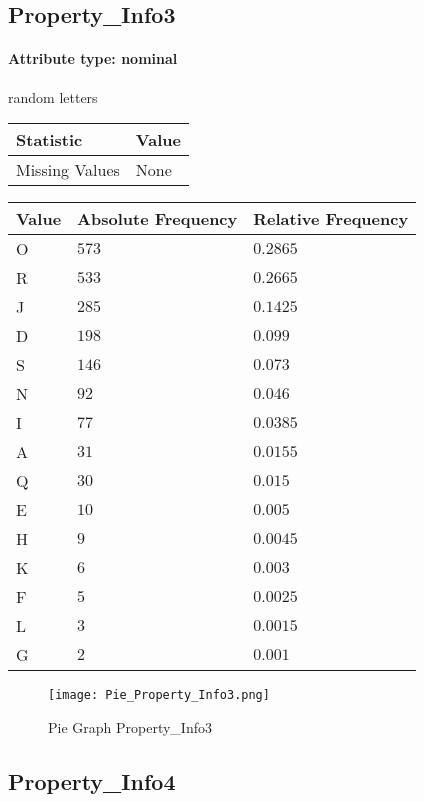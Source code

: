 \subsection{Property\_Info3}
\paragraph{Attribute type: nominal} random letters

\begin{table}[H]
	\renewcommand{\arraystretch}{1.25}
	\begin{tabular}{l|l}
		\textbf{Statistic} & \textbf{Value}\\\hline
		Missing Values& None\\\hline
	\end{tabular}
\end{table}
\begin{table}[H]
	\renewcommand{\arraystretch}{1.25}
	\begin{tabular}{l|l|l}
		\textbf{Value} & \textbf{Absolute Frequency} & \textbf{Relative Frequency}\\\hline
		O&$573$&$0.2865$\\\hline
		R&$533$&$0.2665$\\\hline
		J&$285$&$0.1425$\\\hline
		D&$198$&$0.099$\\\hline
		S&$146$&$0.073$\\\hline
		N&$92$&$0.046$\\\hline
		I&$77$&$0.0385$\\\hline
		A&$31$&$0.0155$\\\hline
		Q&$30$&$0.015$\\\hline
		E&$10$&$0.005$\\\hline
		H&$9$&$0.0045$\\\hline
		K&$6$&$0.003$\\\hline
		F&$5$&$0.0025$\\\hline
		L&$3$&$0.0015$\\\hline
		G&$2$&$0.001$
	\end{tabular}
\end{table}
\begin{figure}[H]
	\begin{center}
		\texttt{[image: Pie\_Property\_Info3.png]}
	\end{center}
	\caption{Pie Graph Property\_Info3}
\end{figure}

\subsection{Property\_Info4}
